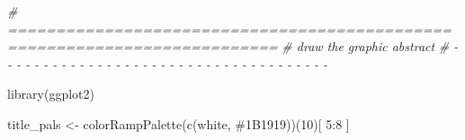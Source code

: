 \documentclass[
]{article}
\newenvironment{Shaded}{\begin{snugshade}}{\end{snugshade}}
\newcommand{\CommentTok}[1]{\textcolor[rgb]{0.56,0.35,0.01}{\textit{#1}}}
\newcommand{\DecValTok}[1]{\textcolor[rgb]{0.00,0.00,0.81}{#1}}
\newcommand{\FunctionTok}[1]{\textcolor[rgb]{0.00,0.00,0.00}{#1}}
\newcommand{\NormalTok}[1]{#1}
\newcommand{\OtherTok}[1]{\textcolor[rgb]{0.56,0.35,0.01}{#1}}
\newcommand{\SpecialCharTok}[1]{\textcolor[rgb]{0.00,0.00,0.00}{#1}}
\newcommand{\StringTok}[1]{\textcolor[rgb]{0.31,0.60,0.02}{#1}}
\begin{document}
\begin{Shaded}
\begin{Highlighting}[]
\CommentTok{\# ==========================================================================}
\CommentTok{\# draw the graphic abstract}
\CommentTok{\# {-} {-} {-} {-} {-} {-} {-} {-} {-} {-} {-} {-} {-} {-} {-} {-} {-} {-} {-} {-} {-} {-} {-} {-} {-} {-} {-} {-} {-} {-} {-} {-} {-} {-} {-} {-} {-}}

\FunctionTok{library}\NormalTok{(ggplot2)}

\NormalTok{title\_pals }\OtherTok{\textless{}{-}} \FunctionTok{colorRampPalette}\NormalTok{(}\FunctionTok{c}\NormalTok{(}\StringTok{\textquotesingle{}white\textquotesingle{}}\NormalTok{, }\StringTok{\textquotesingle{}\#1B1919\textquotesingle{}}\NormalTok{))(}\DecValTok{10}\NormalTok{)[ }\DecValTok{5}\SpecialCharTok{:}\DecValTok{8}\NormalTok{ ]}


\end{Highlighting}
\end{Shaded}
\end{document}

